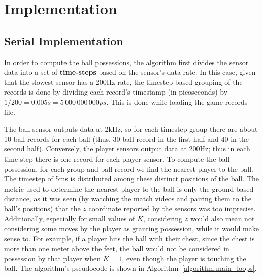 \documentclass[a4paper, 10pt]{article}
\begin{document}
\section*{Implementation}

\subsection*{Serial Implementation}
In order to compute the ball possessions, the algorithm first divides the sensor data into a set of {\bf time-steps} based on the sensor's data rate.
In this case, given that the slowest sensor has a 200Hz rate, the timestep-based grouping of the records is done by dividing each record's timestamp (in picoseconds) by $1 / 200 = 0.005s = 5\,000\,000\,000ps$.
This is done while loading the game records file.

The ball sensor outputs data at 2kHz, so for each timestep group there are about 10 ball records for each ball (thus, 30 ball record in the first half and 40 in the second half). Conversely, the player sensors output data at 200Hz; thus in each time step there is one record for each player sensor.
To compute the ball possession, for each group and ball record we find the nearest player to the ball. The timestep of 5ms is distributed among these distinct positions of the ball.
The metric used to determine the nearest player to the ball is only the ground-based distance, as it was seen (by watching the match videos and pairing them to the ball's positions) that the $z$ coordinate reported by the sensors was too imprecise. 
Additionally, especially for small values of $K$, considering $z$ would also mean not considering some moves by the player as granting possession, while it would make sense to. For example, if a player hits the ball with their chest, since the chest is more than one meter above the feet, the ball would not be considered in possession by that player when $K=1$, even though the player is touching the ball.
The algorithm's pseudocode is shown in Algorithm~\ref{algorithm:main_loops}.
\end{document}
